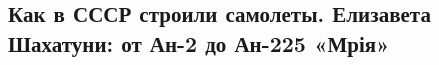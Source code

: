  
 
 
 
 
\subsection{Как в СССР строили самолеты. Елизавета Шахатуни: от Ан-2 до Ан-225 «Мрія»}
\label{sec:13_12_2021.stz.news.ua.hvylya.1.vovnjanko_shahatuni_an225}

